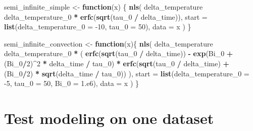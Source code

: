 \documentclass[]{book}
\newenvironment{Shaded}{\begin{snugshade}}{\end{snugshade}}
\newcommand{\ControlFlowTok}[1]{\textcolor[rgb]{0.13,0.29,0.53}{\textbf{#1}}}
\newcommand{\DataTypeTok}[1]{\textcolor[rgb]{0.13,0.29,0.53}{#1}}
\newcommand{\DecValTok}[1]{\textcolor[rgb]{0.00,0.00,0.81}{#1}}
\newcommand{\KeywordTok}[1]{\textcolor[rgb]{0.13,0.29,0.53}{\textbf{#1}}}
\newcommand{\NormalTok}[1]{#1}
\newcommand{\OperatorTok}[1]{\textcolor[rgb]{0.81,0.36,0.00}{\textbf{#1}}}
\newcommand{\StringTok}[1]{\textcolor[rgb]{0.31,0.60,0.02}{#1}}
\begin{document}
\begin{Shaded}
\begin{Highlighting}[]
\NormalTok{semi_infinite_simple <-}\StringTok{ }\ControlFlowTok{function}\NormalTok{(x) \{}
  \KeywordTok{nls}\NormalTok{(}
\NormalTok{    delta_temperature }\OperatorTok{~}\StringTok{ }\NormalTok{delta_temperature_}\DecValTok{0} \OperatorTok{*}\StringTok{ }\KeywordTok{erfc}\NormalTok{(}\KeywordTok{sqrt}\NormalTok{(tau_}\DecValTok{0} \OperatorTok{/}\StringTok{ }\NormalTok{delta_time)),}
    \DataTypeTok{start =} \KeywordTok{list}\NormalTok{(}\DataTypeTok{delta_temperature_0 =} \DecValTok{-10}\NormalTok{, }\DataTypeTok{tau_0 =} \DecValTok{50}\NormalTok{),}
    \DataTypeTok{data =}\NormalTok{ x}
\NormalTok{  )    }
\NormalTok{\}}

\NormalTok{semi_infinite_convection <-}\StringTok{ }\ControlFlowTok{function}\NormalTok{(x)\{}
  \KeywordTok{nls}\NormalTok{(}
\NormalTok{    delta_temperature }\OperatorTok{~}
\StringTok{      }\NormalTok{delta_temperature_}\DecValTok{0} \OperatorTok{*}\StringTok{ }\NormalTok{(}
        \KeywordTok{erfc}\NormalTok{(}\KeywordTok{sqrt}\NormalTok{(tau_}\DecValTok{0} \OperatorTok{/}\StringTok{ }\NormalTok{delta_time)) }\OperatorTok{-}
\StringTok{        }\KeywordTok{exp}\NormalTok{(Bi_}\DecValTok{0} \OperatorTok{+}\StringTok{ }\NormalTok{(Bi_}\DecValTok{0}\OperatorTok{/}\DecValTok{2}\NormalTok{)}\OperatorTok{^}\DecValTok{2} \OperatorTok{*}\StringTok{ }\NormalTok{delta_time }\OperatorTok{/}\StringTok{ }\NormalTok{tau_}\DecValTok{0}\NormalTok{) }\OperatorTok{*}
\StringTok{          }\KeywordTok{erfc}\NormalTok{(}\KeywordTok{sqrt}\NormalTok{(tau_}\DecValTok{0} \OperatorTok{/}\StringTok{ }\NormalTok{delta_time) }\OperatorTok{+}\StringTok{ }
\StringTok{        }\NormalTok{(Bi_}\DecValTok{0}\OperatorTok{/}\DecValTok{2}\NormalTok{) }\OperatorTok{*}\StringTok{ }\KeywordTok{sqrt}\NormalTok{(delta_time }\OperatorTok{/}\StringTok{ }\NormalTok{tau_}\DecValTok{0}\NormalTok{))}
\NormalTok{      ),}
    \DataTypeTok{start =} \KeywordTok{list}\NormalTok{(}\DataTypeTok{delta_temperature_0 =} \DecValTok{-5}\NormalTok{, }\DataTypeTok{tau_0 =} \DecValTok{50}\NormalTok{, }\DataTypeTok{Bi_0 =} \DecValTok{1}\NormalTok{.e6),}
    \DataTypeTok{data =}\NormalTok{ x}
\NormalTok{  )}
\NormalTok{\}}
\end{Highlighting}
\end{Shaded}

\hypertarget{test-modeling-on-one-dataset}{%
\section{Test modeling on one dataset}\label{test-modeling-on-one-dataset}}
\end{document}
